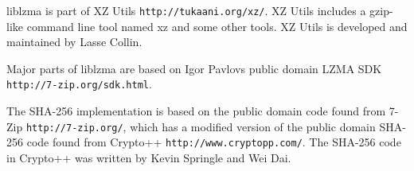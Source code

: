 liblzma is part of XZ Utils {\tt http\+://tukaani.\+org/xz/}. XZ Utils includes a gzip-\/like command line tool named xz and some other tools. XZ Utils is developed and maintained by Lasse Collin.

Major parts of liblzma are based on Igor Pavlov\textquotesingle{}s public domain L\+Z\+MA S\+DK {\tt http\+://7-\/zip.\+org/sdk.\+html}.

The S\+H\+A-\/256 implementation is based on the public domain code found from 7-\/\+Zip {\tt http\+://7-\/zip.\+org/}, which has a modified version of the public domain S\+H\+A-\/256 code found from Crypto++ {\tt http\+://www.\+cryptopp.\+com/}. The S\+H\+A-\/256 code in Crypto++ was written by Kevin Springle and Wei Dai. 